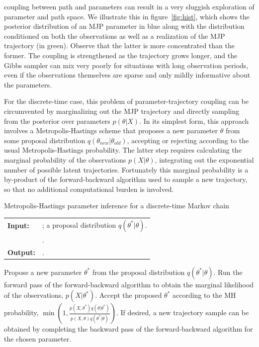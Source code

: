 coupling between path and parameters can result in a very sluggish
exploration of parameter and path space. We illustrate this in figure~\ref{fig:hist},
which shows the posterior distribution of an MJP parameter in blue
along with the distribution conditioned on both the observations 
as well as a realization of the MJP trajectory (in green). 
Observe that the latter is more concentrated than the former. The
coupling is strengthened as the trajectory grows longer, and
the Gibbs sampler can mix very poorly for situations with
long observation periods, even if the observations themselves are
sparse and only mildly informative about the parameters.

For the discrete-time case, this problem of parameter-trajectory
coupling can be circumvented by marginalizing out the MJP trajectory 
and directly sampling from the posterior over parameters $p(\theta|X)$.
In its simplest form, this approach involves a Metropolis-Hastings
scheme that proposes a new parameter $\theta$ from some proposal distribution 
$q(\theta_{new}|\theta_{old})$, accepting or rejecting according to the usual
Metropolis-Hastings probability. The latter step requires calculating the 
marginal probability of the observations $p(X|\theta)$, integrating out
the exponential number of possible latent trajectories. Fortunately
this marginal probability is a by-product of the forward-backward
algorithm used to sample a new trajectory, so that no 
additional computational burden is involved. 

\begin{algorithm}[H]
  \caption{Metropolis-Hastings parameter inference for a discrete-time 
Markov chain}
   \label{alg:disc_time_mh}
  \begin{tabular}{l l}
   \textbf{Input:  } & \text{A set of observations $X$};
    a proposal distribution $q(\theta^*|\theta)$. \\
  & \text{The previous Markov chain parameters $\theta$}.\\
  \textbf{Output:  }& \text{A new Markov chain parameter $\theta^*$}.\\
   \hline
   \end{tabular}
   \begin{algorithmic}[1]
  \State Propose a new parameter $\theta^*$ from the proposal distribution
    $q(\theta^*|\theta)$.
  \State Run the forward pass of the forward-backward algorithm to 
    obtain the marginal likelihood of the observations, $p(X|\theta^*)$.
  \State Accept the proposed $\theta^*$ according to the MH probability, 
    $\min(1,\frac{p(X,\theta^*)q(\theta|\theta^*)}{p(X,\theta)q(\theta^*|\theta)})$.
  \State If desired, a new trajectory sample can be obtained by
    completing the backward pass of the forward-backward algorithm for the chosen
    parameter.
\end{algorithmic}
\end{algorithm}

